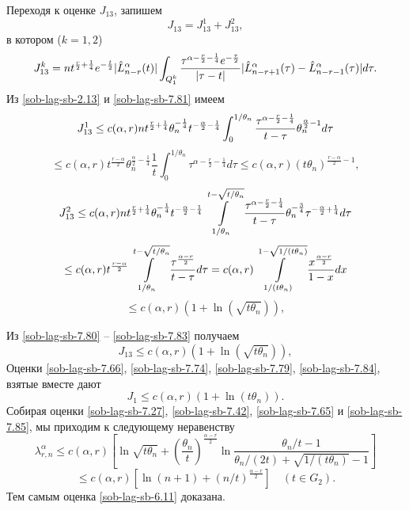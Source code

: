  Переходя к оценке $J_{13}$, запишем
 \begin{equation}\label{sob-lag-sb-7.80}
J_{13}=J_{13}^1+J_{13}^2,
\end{equation}
в котором ($k=1,2$)
\begin{equation}\label{sob-lag-sb-7.81}
J_{13}^k=nt^{\frac{r}{2}+\frac14}e^{-\frac{t}{2}}|\hat L_{n-r}^\alpha(t)|\int_{Q_1^k}{\tau^{\alpha-\frac{r}{2}-\frac14}e^{-\frac{\tau}{2}}\over |\tau-t|}|\hat L_{n-r+1}^\alpha(\tau)-\hat L_{n-r-1}^\alpha(\tau)|d\tau.
\end{equation}
 Из  \eqref{sob-lag-sb-2.13} и \eqref{sob-lag-sb-7.81} имеем
$$
J_{13}^1\le c(\alpha,r)nt^{\frac{r}{2}+\frac14}\theta_n^{-\frac14}t^{-\frac{\alpha}{2}-\frac14}\int_0^{1/\theta_n}
{\tau^{\alpha-\frac{r}{2}-\frac14}\over t-\tau}\theta_n^{\frac{\alpha}{2}-1}d\tau
$$
\begin{equation}\label{sob-lag-sb-7.82}
\le c(\alpha,r)t^\frac{r-\alpha}{2}\theta_n^{\frac{\alpha}{2}-\frac14}\frac{1}{t}\int_0^{1/\theta_n}
\tau^{\alpha-\frac{r}{2}-\frac14}d\tau
\le c(\alpha,r)(t\theta_n)^{\frac{r-\alpha}{2}-1},
\end{equation}
$$
J_{13}^2\le c(\alpha,r)nt^{\frac{r}{2}+\frac14}\theta_n^{-\frac14}t^{-\frac{\alpha}{2}-\frac14}
\int\limits_{1/\theta_n}^{t-\sqrt{t/\theta_n}}
{\tau^{\alpha-\frac{r}{2}-\frac14}\over t-\tau}\theta_n^{-\frac{3}{4}}\tau^{-\frac{\alpha}{2}+\frac14}d\tau
$$
$$
\le c(\alpha,r)t^{\frac{r-\alpha}{2}}\int\limits_{1/\theta_n}^{t-\sqrt{t/\theta_n}}
{\tau^{\frac{\alpha-r}{2}}\over t-\tau}d\tau=c(\alpha,r)\int\limits_{1/(t\theta_n)}^{1-\sqrt{1/(t\theta_n)}}
{x^{\frac{\alpha-r}{2}}\over 1-x}dx
$$
\begin{equation}\label{sob-lag-sb-7.83}
\le c(\alpha,r)\left(1+\ln\left(\sqrt{t\theta_n}\right)\right),
\end{equation}

Из  \eqref{sob-lag-sb-7.80} -- \eqref{sob-lag-sb-7.83} получаем
\begin{equation}\label{sob-lag-sb-7.84}
J_{13}\le c(\alpha,r)\left(1+\ln\left(\sqrt{t\theta_n}\right)\right),
\end{equation}
Оценки  \eqref{sob-lag-sb-7.66},  \eqref{sob-lag-sb-7.74}, \eqref{sob-lag-sb-7.79}, \eqref{sob-lag-sb-7.84}, взятые вместе дают
\begin{equation}\label{sob-lag-sb-7.85}
J_{1}\le c(\alpha,r)\left(1+\ln\left(t\theta_n\right)\right).
\end{equation}
Собирая оценки \eqref{sob-lag-sb-7.27}, \eqref{sob-lag-sb-7.42}, \eqref{sob-lag-sb-7.65} и \eqref{sob-lag-sb-7.85}, мы приходим к следующему  неравенству
$$
\lambda_{r,n}^\alpha\le c(\alpha,r)\left[\ln\sqrt{t\theta_n} +\left(\frac{\theta_n}{t}\right)^\frac{\alpha-r}{2}
\ln\frac{\theta_n/t-1}{\theta_n/(2t)+\sqrt{1/(t\theta_n)}-1}\right]
$$
\begin{equation}\label{sob-lag-sb-7.86}
\le c(\alpha,r)[\ln(n+1)+(n/t)^\frac{\alpha-r}{2}]\quad (t\in G_2).
\end{equation}
Тем самым оценка \eqref{sob-lag-sb-6.11} доказана.


